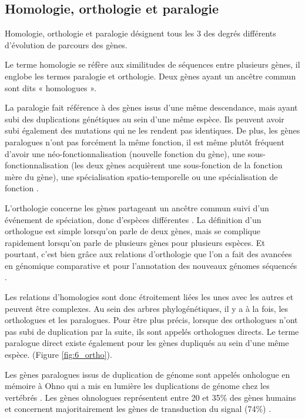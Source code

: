 \subsection{Homologie, orthologie et paralogie}\label{homologie}
\par Homologie, orthologie et paralogie désignent tous les 3 des degrés différents d’évolution de parcours des gènes. 
\par Le terme homologie se réfère aux similitudes de séquences entre plusieurs gènes, il englobe les termes paralogie et orthologie. Deux gènes ayant un ancêtre commun sont dits « homologues ».
\par La paralogie fait référence à des gènes issus d’une même descendance, mais ayant subi des duplications génétiques au sein d’une même espèce. Ils peuvent avoir subi également des mutations qui ne les rendent pas identiques. De plus, les gènes paralogues n’ont pas forcément la même fonction, il est même plutôt fréquent d’avoir une néo-fonctionnalisation (nouvelle fonction du gène), une sous-fonctionnalisation (les deux gènes acquièrent une sous-fonction de la fonction mère du gène), une spécialisation spatio-temporelle ou une spécialisation de fonction \parencite{kuzmin_retention_2022, force_preservation_1999}.
\par L’orthologie concerne les gènes partageant un ancêtre commun suivi d’un événement de spéciation, donc d’espèces différentes \parencite{fitch_distinguishing_1970}. La définition d’un orthologue est simple lorsqu’on parle de deux gènes, mais se complique rapidement lorsqu’on parle de plusieurs gènes pour plusieurs espèces. Et pourtant, c’est bien grâce aux relations d’orthologie que l’on a fait des avancées en génomique comparative et pour l’annotation des nouveaux génomes séquencés \parencite{huerta-cepas_fast_2017}. 
\par Les relations d’homologies sont donc étroitement liées les unes avec les autres et peuvent être complexes. Au sein des arbres phylogénétiques, il y a à la fois, les orthologues et les paralogues. Pour être plus précis, lorsque des orthologues n’ont pas subi de duplication par la suite, ils sont appelés orthologues directs. Le terme paralogue direct existe également pour les gènes dupliqués au sein d’une même espèce. (Figure \ref{fig:6_ortho}). 
\par Les gènes paralogues issus de duplication de génome sont appelés onhologue en mémoire à Ohno qui a mis en lumière les duplications de génome chez les vertébrés \parencite{ohno_evolution_1968}. Les gènes ohnologues représentent entre 20 et 35\% des gènes humains et concernent majoritairement les gènes de transduction du signal (74\%) \parencite{singh_identification_2015}. 

